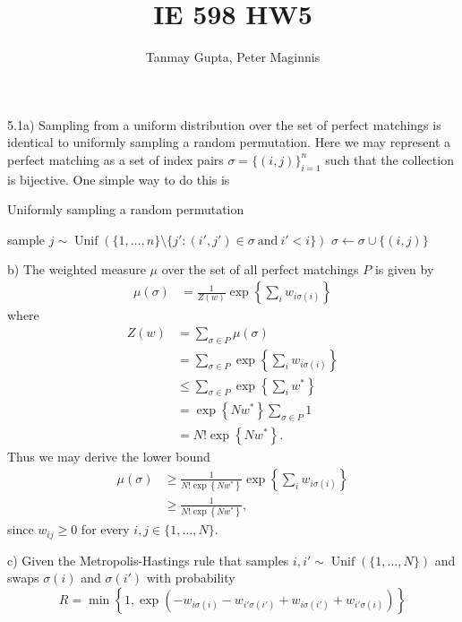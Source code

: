 \documentclass[10pt,onecolumn,letterpaper]{article}
\begin{document}
\title{IE 598 HW5}
\author{Tanmay Gupta, Peter Maginnis}
\maketitle

5.1a) Sampling from a uniform distribution over the set of perfect matchings is identical to uniformly sampling a random permutation.  Here we may represent a perfect matching as a set of index pairs $\sigma=\{(i,j)\}_{i=1}^n$ such that the collection is bijective.  One simple way to do this is
%
%
\begin{algorithm}
\raggedright
  \caption{Uniformly sampling a random permutation}
  \begin{algorithmic}
    \STATE sample $j\sim\operatorname{Unif}\left(\{1,\dotsc, n\}\setminus\{j':(i',j')\in\sigma\ \mathrm{ and }\ i'<i\}\right)$
    \STATE $\sigma\gets\sigma\cup\{(i,j)\}$
     \ENDFOR
  \end{algorithmic}
\end{algorithm}

b) The weighted measure $\mu$ over the set of all perfect matchings $P$ is given by 
\begin{align*}
   \mu(\sigma)&=\frac{1}{Z(w)}\exp\left\{\sum_i w_{i\sigma(i)}\right\}%
\end{align*}
where
\begin{align*}
  Z(w)&=\sum_{\sigma\in P}\mu(\sigma)\\
  &=\sum_{\sigma\in P}\exp\left\{\sum_i w_{i\sigma(i)}\right\}\\
  &\leq\sum_{\sigma\in P}\exp\left\{\sum_i w^*\right\}\\
  &=\exp\left\{Nw^*\right\}\sum_{\sigma\in P}1\\
  &=N!\exp\left\{Nw^*\right\}.
\end{align*}
Thus we may derive the lower bound
\begin{align*}
   \mu(\sigma)&\geq\frac{1}{N!\exp\left\{Nw^*\right\}}\exp\left\{\sum_i w_{i\sigma(i)}\right\}\\
   &\geq\frac{1}{N!\exp\left\{Nw^*\right\}},
\end{align*}
since $w_{ij}\geq0$ for every $i,j\in\{1,\dotsc,N\}$.

c) Given the Metropolis-Hastings rule that samples $i,i'\sim\operatorname{Unif}(\{1,\dotsc, N\})$ and swaps $\sigma(i)$ and $\sigma(i')$ with probability
\begin{equation*}
 R = \min\left\{1, \exp(-w_{i\sigma(i)}-w_{i'\sigma(i')}+w_{i\sigma(i')}+w_{i'\sigma(i)}) \right\}
\end{equation*}
\end{document}

